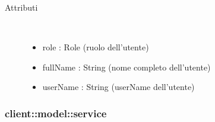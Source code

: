 \begin{description}
\item[Attributi] \hfill \\
 \vspace{-7mm}
\begin{itemize}
\item role : Role (ruolo dell'utente)
\item fullName : String (nome completo dell'utente)
\item userName : String (userName dell'utente)
\end{itemize}

\end{description}

\vspace{0.5cm}
\subsubsection{client::model::service}
